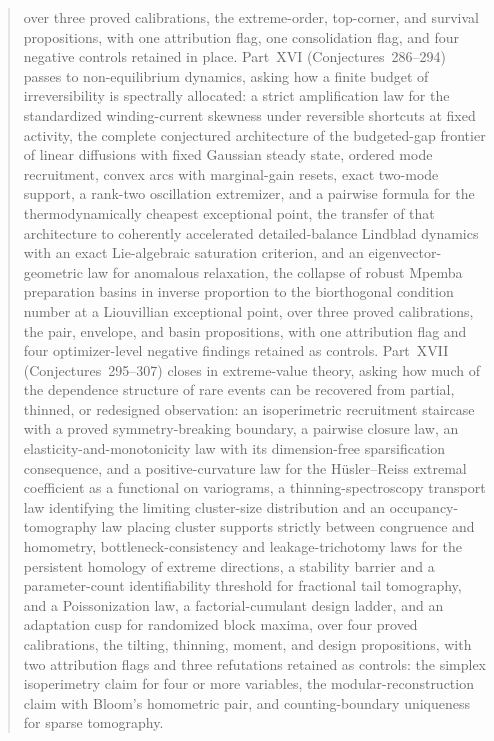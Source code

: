 \documentclass[11pt]{article}
\theoremstyle{definition}
\begin{document}
\begin{abstract}
over three proved calibrations, the extreme-order, top-corner, and survival propositions, with one attribution flag, one consolidation flag, and four negative controls retained in place.  Part~XVI (Conjectures~286--294) passes to non-equilibrium dynamics, asking how a finite budget of irreversibility is spectrally allocated: a strict amplification law for the standardized winding-current skewness under reversible shortcuts at fixed activity, the complete conjectured architecture of the budgeted-gap frontier of linear diffusions with fixed Gaussian steady state, ordered mode recruitment, convex arcs with marginal-gain resets, exact two-mode support, a rank-two oscillation extremizer, and a pairwise formula for the thermodynamically cheapest exceptional point, the transfer of that architecture to coherently accelerated detailed-balance Lindblad dynamics with an exact Lie-algebraic saturation criterion, and an eigenvector-geometric law for anomalous relaxation, the collapse of robust Mpemba preparation basins in inverse proportion to the biorthogonal condition number at a Liouvillian exceptional point, over three proved calibrations, the pair, envelope, and basin propositions, with one attribution flag and four optimizer-level negative findings retained as controls.  Part~XVII (Conjectures~295--307) closes in extreme-value theory, asking how much of the dependence structure of rare events can be recovered from partial, thinned, or redesigned observation: an isoperimetric recruitment staircase with a proved symmetry-breaking boundary, a pairwise closure law, an elasticity-and-monotonicity law with its dimension-free sparsification consequence, and a positive-curvature law for the H\"usler--Reiss extremal coefficient as a functional on variograms, a thinning-spectroscopy transport law identifying the limiting cluster-size distribution and an occupancy-tomography law placing cluster supports strictly between congruence and homometry, bottleneck-consistency and leakage-trichotomy laws for the persistent homology of extreme directions, a stability barrier and a parameter-count identifiability threshold for fractional tail tomography, and a Poissonization law, a factorial-cumulant design ladder, and an adaptation cusp for randomized block maxima, over four proved calibrations, the tilting, thinning, moment, and design propositions, with two attribution flags and three refutations retained as controls: the simplex isoperimetry claim for four or more variables, the modular-reconstruction claim with Bloom's homometric pair, and counting-boundary uniqueness for sparse tomography.
\end{abstract}
\end{document}
